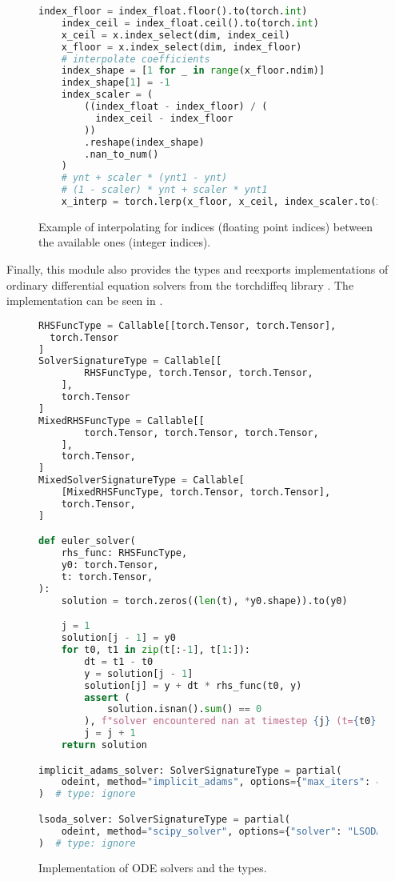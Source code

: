 \begin{figure}[H]
  \centering
  \begin{lstlisting}[language=Python]
    index_floor = index_float.floor().to(torch.int)
    index_ceil = index_float.ceil().to(torch.int)
    x_ceil = x.index_select(dim, index_ceil)
    x_floor = x.index_select(dim, index_floor)
    # interpolate coefficients
    index_shape = [1 for _ in range(x_floor.ndim)]
    index_shape[1] = -1
    index_scaler = (
        ((index_float - index_floor) / (
          index_ceil - index_floor
        ))
        .reshape(index_shape)
        .nan_to_num()
    )
    # ynt + scaler * (ynt1 - ynt)
    # (1 - scaler) * ynt + scaler * ynt1
    x_interp = torch.lerp(x_floor, x_ceil, index_scaler.to(x))
  \end{lstlisting}
  \caption{Example of interpolating for indices (floating point indices) between the available ones (integer indices).}\label{fig:coefficient_interpolation_impl}
\end{figure}

Finally, this module also provides the types and reexports implementations of ordinary differential equation solvers from the torchdiffeq library \autocite{Chen_torchdiffeq_2021}. The implementation can be seen in .
\begin{figure}[H]
  \centering
  \begin{lstlisting}[language=Python]
RHSFuncType = Callable[[torch.Tensor, torch.Tensor],
  torch.Tensor
]
SolverSignatureType = Callable[[
        RHSFuncType, torch.Tensor, torch.Tensor,
    ],
    torch.Tensor
]
MixedRHSFuncType = Callable[[
        torch.Tensor, torch.Tensor, torch.Tensor,
    ],
    torch.Tensor,
]
MixedSolverSignatureType = Callable[
    [MixedRHSFuncType, torch.Tensor, torch.Tensor],
    torch.Tensor,
]

def euler_solver(
    rhs_func: RHSFuncType,
    y0: torch.Tensor,
    t: torch.Tensor,
):
    solution = torch.zeros((len(t), *y0.shape)).to(y0)

    j = 1
    solution[j - 1] = y0
    for t0, t1 in zip(t[:-1], t[1:]):
        dt = t1 - t0
        y = solution[j - 1]
        solution[j] = y + dt * rhs_func(t0, y)
        assert (
            solution.isnan().sum() == 0
        ), f"solver encountered nan at timestep {j} (t={t0})"
        j = j + 1
    return solution

implicit_adams_solver: SolverSignatureType = partial(
    odeint, method="implicit_adams", options={"max_iters": 4}
)  # type: ignore

lsoda_solver: SolverSignatureType = partial(
    odeint, method="scipy_solver", options={"solver": "LSODA"}
)  # type: ignore
  \end{lstlisting}
  \caption{Implementation of ODE solvers and the types.}\label{fig:solver_impl}
\end{figure}

